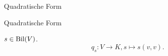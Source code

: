 \documentclass[class=article, crop=false]{standalone}
\begin{document}
\begin{zettel}{Quadratische Form}
\begin{flashcard}[agt1p5w5]{Quadratische Form}
	\begin{definition}
		$s \in  \operatorname{Bil} (V)$.
		\[
			q_s : V \to  K , s \mapsto  s (v,v )
		.\]
	\end{definition}

\end{flashcard}

\end{zettel}
\end{document}
